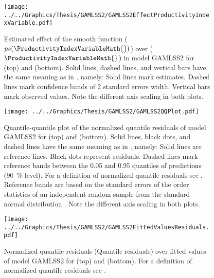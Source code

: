 \begin{figure}[h]
  \centering
  \texttt{[image: ../../Graphics/Thesis/GAMLSS2/GAMLSS2EffectProductivityIndexVariable.pdf]}
  \caption{Estimated effect of the \ProductivityIndexVariableText{} smooth function (\(ps(\ProductivityIndexVariableMath{})\)) over \ProductivityIndexVariableText{} (\(\ProductivityIndexVariableMath{}\)) in model GAMLSS2 for \Beech{} (top) and \Spruce{} (bottom).  Solid lines, dashed lines, and vertical bars have the same meaning as in , namely:  Solid lines mark estimates.  Dashed lines mark confidence bands of 2 standard errors width.  Vertical bars mark observed values.  Note the different axis scaling in both plots.}
  \label{fig:GAMLSS2EffectProductivityIndexVariable}
\end{figure}

\begin{figure}[h]
  \centering
  \texttt{[image: ../../Graphics/Thesis/GAMLSS2/GAMLSS2QQPlot.pdf]}
  \caption{Quantile-quantile plot of the normalized quantile residuals of model GAMLSS2 for \Beech{} (top) and \Spruce{} (bottom). Solid lines, black dots, and dashed lines have the same meaning as in , namely:  Solid lines are reference lines.  Black dots represent residuals.  Dashed lines mark reference bands between the \num{0.05} and \num{0.95} quantiles of predictions (\SI{90}{\percent} level).  For a definition of normalized quantile residuals see \textcite{Dunn1996}.  Reference bands are based on the standard errors of the order statistics of an independent random sample from the standard normal distribution \parencite{Fox2016}.  Note the different axis scaling in both plots.}
  \label{fig:GAMLSS2QQPlot}
\end{figure}

\begin{figure}[h]
  \centering
  \texttt{[image: ../../Graphics/Thesis/GAMLSS2/GAMLSS2FittedValuesResiduals.pdf]}
  \caption{Normalized quantile residuals (Quantile residuals) over fitted values of model GAMLSS2 for \Beech{} (top) and \Spruce{} (bottom).  For a definition of normalized quantile residuals see \textcite{Dunn1996}.}
  \label{fig:GAMLSS2FittedValuesResiduals}
\end{figure}

